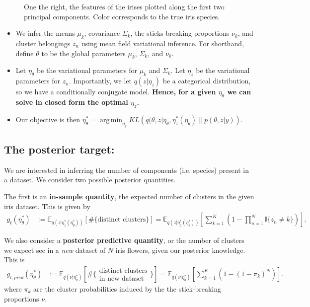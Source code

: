 \documentclass[a0,plainsections]{sciposter}\usepackage[]{graphicx}\usepackage[]{color}
\newcommand{\Expect}{\mathbb{E}}
\newcommand{\etazopt}{\eta_z^{*}}
\newcommand{\etathetaopt}{\eta_\theta^{*}}
\DeclareMathOperator*{\argmin}{arg\,min}
\begin{document}
\begin{minipage}[t]{0.45\textwidth}
\begin{figure}[!h]
{One the right, the features of the irises plotted along the first two principal components. Color corresponds to the true iris species. }
\setlength{\textfloatsep}{-10pt}
\end{figure}

\begin{itemize}

\item We infer the means $\mu_k$, covariance $\Sigma_k$, the sticks-breaking proportions $\nu_k$, and cluster belongings $z_n$ using mean field variational inference. For shorthand, define $\theta$ to be the global parameters $\mu_k$, $\Sigma_k$, and $\nu_k$. 

\item Let $\eta_\theta$ be the variational parameters for $\mu_k$ and $\Sigma_k$. Let $\eta_z$ be the variational parameters for $z_n$. Importantly, we let $q(z | \eta_z)$ be a categorical distribution, so we have a conditionally conjugate model. {\bf Hence, for a given $\eta_\theta$ we can solve in closed form the optimal $\eta_z$.} 

\item Our objective is then 
$\etathetaopt = 
\argmin_{\eta_\theta} KL\left(
    q(\theta, z \vert \eta_\theta, \etazopt(\eta_\theta) \big\| p(\theta, z | y)
    \right)$. 
\end{itemize}
\vspace{-0.6in}
\subsection*{The posterior target: }
\vspace{-0.3in}
We are interested in inferring the number of components (i.e. species) present in a dataset. We consider two possible posterior quantities. 

The first is an {\bf in-sample quantity}, the expected number of clusters in the given iris dataset. This is given by 
%
\vspace{-0.3in}
\begin{align}
g_t(\etathetaopt) &:=
\Expect_{q(z \vert \etazopt(\etathetaopt))} \left[ \#\{\text{distinct clusters}\} \right]
= \Expect_{q(z \vert \etazopt(\etathetaopt))} \left[
    \sum_{k=1}^K \left(1 - \prod_{n=1}^N \mathbb{I}\{z_n \ne k\} \right) \right].
\label{eq:expected_num_clusters_thresh}
\end{align}

We also consider a {\bf posterior predictive quantity}, or the number of clusters we expect see in a \textit{new} dataset of $N$ iris flowers, given our posterior knowledge. This is
\begin{align}
g_{t, pred}(\etathetaopt) &:=
\Expect_{q(\nu \vert \etathetaopt)} 
\left[\#\{\substack{\text{distinct clusters}\\\text{in new dataset}}\} \right]  =
\Expect_{q(\nu \vert \etathetaopt)} \left[\sum_{k=1}^K \left(1 -
(1 - \pi_k)^{N}\right)\right].
    \label{eq:expected_num_clusters_pred_thresh}
\end{align}
where $\pi_k$ are the cluster probabilities induced by the the stick-breaking proportions $\nu$.


\end{minipage}
\end{document}
